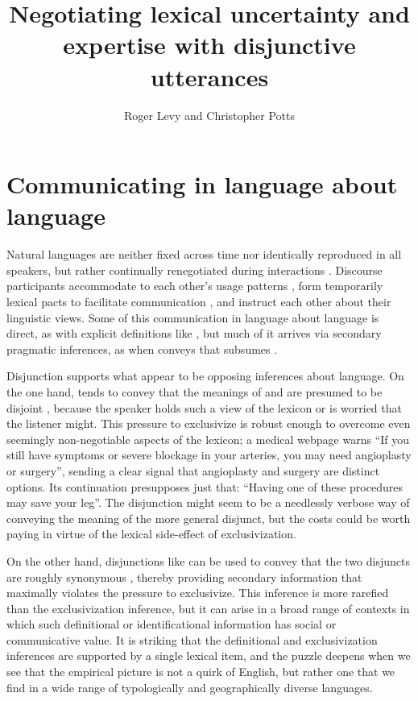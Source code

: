 \documentclass{article}
\begin{document}

\title{Negotiating lexical uncertainty and expertise with disjunctive utterances}
\author{Roger Levy and Christopher Potts}
\maketitle


\section{Communicating in language about language}\label{sec:introduction}

Natural languages are neither fixed across time nor identically
reproduced in all speakers, but rather continually renegotiated during
interactions \citep{Clark97}. Discourse participants accommodate to
each other's usage patterns \citep{Giles:Coupland:Coupland:1991}, form
temporarily lexical pacts to facilitate communication
\citep{Clark:Wilkes-Gibbs:1986,Brennan:Clark:1996}, and instruct each
other about their linguistic views. Some of this communication in
language about language is direct, as with explicit definitions like
, but much of it arrives via
secondary pragmatic inferences, as when  conveys
that  subsumes  \citep{Hearst92,SnowEtAl05}.

Disjunction supports what appear to be opposing inferences about
language. On the one hand,  tends to convey that the
meanings of  and  are presumed to be disjoint
\citep{Hurford:1974}, because the speaker holds such a view of the
lexicon or is worried that the listener might. This pressure to
exclusivize is robust enough to overcome even seemingly non-negotiable
aspects of the lexicon; a medical webpage warns ``If you still have
symptoms or severe blockage in your arteries, you may need angioplasty
or surgery'', sending a clear signal that angioplasty and surgery
are distinct options. Its continuation presupposes just that: 
``Having one of these procedures may save your leg''. The disjunction
might seem to be a needlessly verbose way of conveying the meaning of
the more general disjunct, but the costs could be worth paying in
virtue of the lexical side-effect of exclusivization.

On the other hand, disjunctions like 
can be used to convey that the two disjuncts are roughly synonymous
\citep{Horn89}, thereby providing secondary information that maximally
violates the pressure to exclusivize. This inference is more rarefied
than the exclusivization inference, but it can arise in a broad range
of contexts in which such definitional or identificational information
has social or communicative value. It is striking that the
definitional and exclusivization inferences are supported by a single
lexical item, and the puzzle deepens when we see that the empirical
picture is not a quirk of English, but rather one that we find in a
wide range of typologically and geographically diverse languages.
\end{document}
